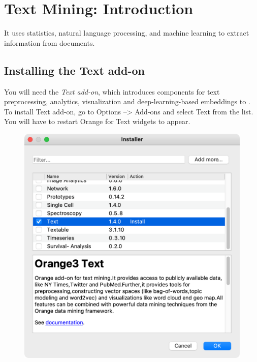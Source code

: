 \chapter{Text Mining: Introduction}

 It uses statistics, natural language processing, and machine learning to extract information from documents.

\section{Installing the Text add-on}

You will need the \emph{Text add-on}, which introduces components for text preprocessing, analytics, visualization and deep-learning-based embeddings to \mutation. To install Text add-on, go to Options --> Add-ons and select Text from the list. You will have to restart Orange for Text widgets to appear.

\vspace{-0.2cm}
\begin{figure}[h]
  \centering
  \includegraphics[width=\linewidth]{add-on-installation.png}%
  \caption{$\;$}
\end{figure}
\vspace{-0.3cm}

